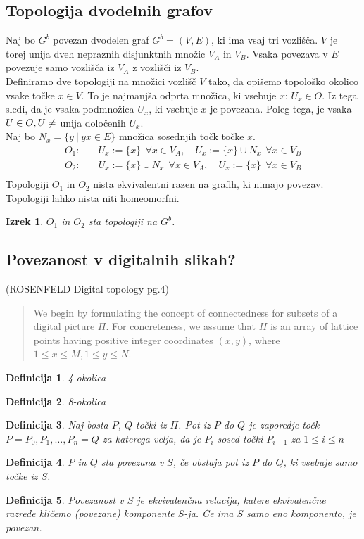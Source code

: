 \documentclass[mat1, tisk]{fmfdelo}
\newtheorem{definition}{Definicija}[subsection]
\newtheorem{theorem}{Izrek}[subsection]
\begin{document}
\subsection{Topologija dvodelnih grafov}
Naj bo $G^b$ povezan dvodelen graf $G^b = (V,E)$, ki ima vsaj tri vozlišča.
$V$ je torej unija dveh nepraznih disjunktnih množic $V_A$ in $V_B$. Vsaka
povezava v $E$ povezuje samo vozlišča iz $V_A$ z vozlišči iz $V_B$.\\
Definiramo dve topologiji na množici vozlišč $V$ tako, da opišemo
topološko okolico vsake točke $x \in V$. To je najmanjša odprta množica, ki
vsebuje $x$: $U_x \in O$. Iz tega sledi, da je vsaka podmnožica $U_x$, ki vsebuje $x$ je povezana.
Poleg tega, je vsaka $U \in O, U \neq \empty$ unija določenih $U_x$.\\
Naj bo $N_x = \{y \  | \  yx \in E\}$ množica sosednjih točk točke $x$.\\
\[
  \begin{split}
  O_1:&\quad
  U_x:=\{x\}\ \ \forall x \in V_A, \quad
  U_x:=\{x\}\cup N_x\ \  \forall x \in V_B\\
  O_2:&\quad
  U_x:=\{x\}\cup N_x\ \  \forall x \in V_A, \quad
  U_x:=\{x\}\ \ \forall x \in V_B\\
\end{split}
\]
Topologiji $O_1$ in $O_2$ nista ekvivalentni razen na grafih, ki nimajo povezav.
Topologiji lahko nista niti homeomorfni.
\begin{theorem}
  $O_1$ in $O_2$ sta topologiji na $G^b$.
\end{theorem}
\subsection{Povezanost v digitalnih slikah?}
(ROSENFELD Digital topology pg.4) 
\begin{quote}
  We begin by formulating the concept of connectedness for subsets of a digital picture $\Pi$.
  For concreteness, we assume that $H$ is an array of lattice points having positive integer coordinates $(x,y)$, where $1 \leq x \leq M, 1 \leq y \leq N$.
\end{quote}
\begin{definition}
  4-okolica
\end{definition}
\begin{definition}
  8-okolica
\end{definition}
\begin{definition}
  Naj bosta $P$, $Q$ točki iz $\Pi$. Pot iz $P$ do $Q$ je zaporedje točk 
  $P = P_0,P_1,\dots,P_n = Q$ za katerega velja, da je $P_i$ sosed točki
  $P_{i-1}$ za $1 \leq i \leq n$
\end{definition}
\begin{definition}
  $P$ in $Q$ sta povezana v $S$, če obstaja pot iz $P$ do $Q$, ki vsebuje
  samo točke iz $S$.
\end{definition}
\begin{definition}
  Povezanost v $S$ je ekvivalenčna relacija, katere ekvivalenčne \\ razrede kličemo
  (povezane) komponente $S$-ja. Če ima $S$ samo eno komponento, je povezan.
\end{definition}
\end{document}
